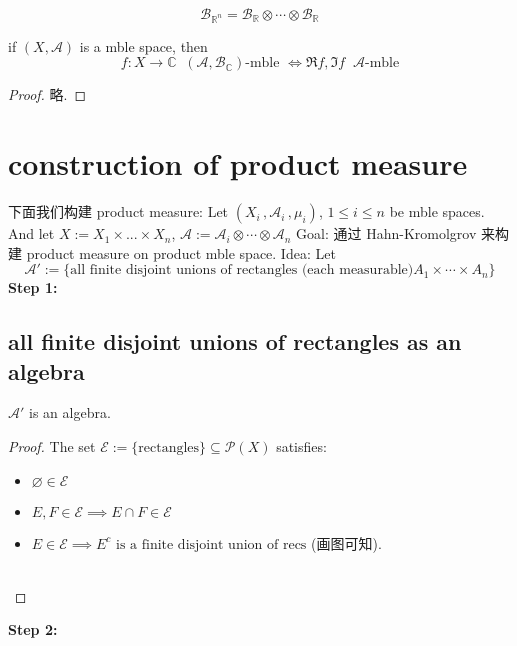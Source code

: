 \documentclass[lang=cn,11pt]{elegantbook}
\begin{document}
\begin{example}
    $$\mathcal{B}_{\mathbb{R}^n} = \mathcal{B}_{\mathbb{R}} \otimes \cdots \otimes \mathcal{B}_{\mathbb{R}}$$
\end{example}


\begin{corollary}
    if $(X,\mathcal{A})$ is a mble space, then $$f:X\rightarrow \mathbb{C}  \;\;(\mathcal{A},\mathcal{B}_{\mathbb{C}})\text{-mble } \Longleftrightarrow \Re f, \Im f \;\;\mathcal{A}\text{-mble}$$
\end{corollary}
\begin{proof}
    略.
\end{proof}

\section{construction of product measure}
下面我们构建 product measure: 
Let $(X_i \,,\mathcal{A}_i\, , \mu_i)$, $1 \leq i \leq n$ be mble spaces.\\
    And let $X := X_1 \times ... \times X_n$, $\mathcal{A}:= \mathcal{A}_i \otimes \cdots \otimes \mathcal{A}_n$
Goal: 通过 Hahn-Kromolgrov 来构建 product measure on product mble space.
Idea: Let $$\mathcal{A}' := \{   \text{all finite disjoint unions of rectangles (each measurable)} A_1 \times \cdots \times A_n\}$$
\textbf{Step 1: }
\subsection{all finite disjoint unions of rectangles as an algebra}
\begin{proposition}
   $\mathcal{A}'$ is an algebra.
\end{proposition}
\begin{proof}
The set $\mathcal{E}:= \{\text{rectangles}\} \subseteq \mathcal{P}(X)$ satisfies:
    \begin{itemize}
        \item $\varnothing \in \mathcal{E}$
        \item $E,F \in \mathcal{E} \implies E \cap F \in \mathcal{E}$
        \item $E \in \mathcal{ E} \implies E^c \text{ is a finite disjoint union of recs}$ (画图可知).\\\\
    \end{itemize}
\end{proof}

\textbf{Step 2: }
\end{document}
